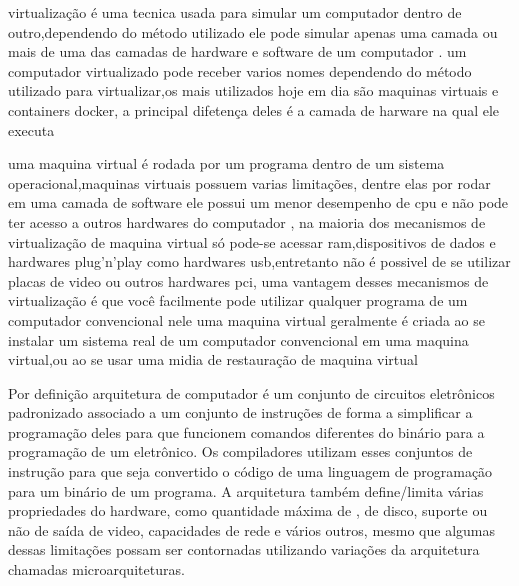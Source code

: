 \documentclass[
	12pt,				%
	openright,			%
	oneside,			%
	a4paper,			%
	english,			%
	french,				%
	spanish,			%
	brazil,				%
	]{abntex2}
\begin{document}

virtualização é uma tecnica usada para simular um computador dentro de outro,dependendo do método utilizado ele pode simular apenas uma camada ou mais de uma das camadas de hardware e software de um computador .
um computador virtualizado pode receber varios nomes dependendo do método utilizado para virtualizar,os mais utilizados hoje em dia são maquinas virtuais e containers docker,
a principal difetença deles é a camada de harware na qual ele executa

uma maquina virtual é rodada por um programa dentro de um sistema operacional,maquinas virtuais possuem varias limitações,
dentre elas por rodar em uma camada de software ele possui um menor desempenho de cpu e não pode ter acesso a outros hardwares do computador ,
na maioria dos mecanismos de virtualização de maquina virtual só pode-se acessar ram,dispositivos de dados e hardwares plug’n’play como hardwares usb,entretanto não é possivel de se utilizar placas de video ou outros hardwares pci,
uma vantagem desses mecanismos de virtualização é que você facilmente pode utilizar qualquer programa de um computador convencional nele
uma maquina virtual geralmente é criada ao se instalar um sistema real de um computador convencional em uma maquina virtual,ou ao se usar uma midia de restauração de maquina virtual

Por definição arquitetura de computador é um conjunto de circuitos eletrônicos padronizado associado a um conjunto de instruções de forma a simplificar a programação deles para que funcionem comandos diferentes do binário para a programação de um eletrônico. 
Os compiladores utilizam esses conjuntos de instrução para que seja convertido o código de uma linguagem de programação para um binário de um programa.
A arquitetura também define/limita várias propriedades do hardware, como quantidade máxima de ,
de disco, suporte ou não de saída de video, capacidades de rede e vários outros, mesmo que algumas dessas limitações possam ser contornadas utilizando variações da arquitetura chamadas microarquiteturas.\newline
\end{document}
